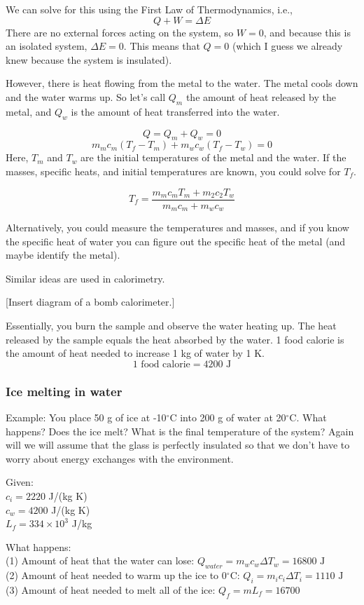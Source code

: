 We can solve for this using the First Law of Thermodynamics, i.e.,
$$Q+W=\Delta{E}$$
There are no external forces acting on the system, so $W=0$, and because this is an isolated system, $\Delta{E}=0$. This means that $Q=0$ (which I guess we already knew because the system is insulated).

However, there is heat flowing from the metal to the water. The metal cools down and the water warms up. So let's call $Q_m$ the amount of heat released by the metal, and $Q_w$ is the amount of heat transferred into the water.

$$Q=Q_m+Q_w=0$$
$$m_mc_m(T_f-T_m)+m_wc_w(T_f-T_w)=0$$
Here, $T_m$ and $T_w$ are the initial temperatures of the metal and the water. If the masses, specific heats, and initial temperatures are known, you could solve for $T_f$.

$$T_f=\frac{m_mc_mT_m+m_2c_2T_w}{m_mc_m+m_wc_w}$$

Alternatively, you could measure the temperatures and masses, and if you know the specific heat of water you can figure out the specific heat of the metal (and maybe identify the metal).


Similar ideas are used in calorimetry.

[Insert diagram of a bomb calorimeter.]
\vspace{5cm}

Essentially, you burn the sample and observe the water heating up. The heat released by the sample equals the heat absorbed by the water. 1 food calorie is the amount of heat needed to increase 1 kg of water by 1 K.
$$1\mbox{ food calorie} = 4200\mbox{ J}$$


\subsubsection{Ice melting in water}
Example: You place 50 g of ice at -10$^\circ$C into 200 g of water at 20$^\circ$C. What happens? Does the ice melt? What is the final temperature of the system? Again will we will assume that the glass is perfectly insulated so that we don't have to worry about energy exchanges with the environment.

Given:\\
$c_i=2220$ J/(kg K)\\
$c_w=4200$ J/(kg K)\\
$L_f=334\times 10^3$ J/kg

What happens:\\
(1) Amount of heat that the water can lose: $Q_{water}=m_wc_w\Delta{T_w}=16800\mbox{ J}$\\
(2) Amount of heat needed to warm up the ice to 0$^\circ$C: $Q_i=m_ic_i\Delta{T_i}=1110\mbox{ J}$\\
(3) Amount of heat needed to melt all of the ice: $Q_f=mL_f=16700$

